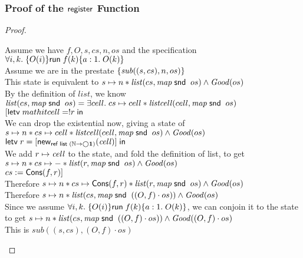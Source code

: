 \subsubsection{Proof of the $\mathsf{register}$ Function}
\begin{proof}
\begin{tabbedproof}
\oo Assume we have $f, O, s, cs, n, os$ and the specification $\forall i,k.\;\{{O(i)}\}{\mathsf{run}\;{f(k)}}\{{a:1}.\;{O(k)}\}$ \\
\ooo Assume we are in the prestate $\{{\mathit{sub}((s,cs), n, os)}\}$ \\
\ooo This state is equivalent to $s \mapsto n * \mathit{list}(cs, \mathit{map}\;\mathsf{snd}\;\;os) \land \mathit{Good}(os)$ \\
\ooo By the definition of $\mathit{list}$, we know \\
\ooox $\mathit{list}(cs, \mathit{map}\;\mathsf{snd}\;\;os) = \exists cell.\;cs \mapsto cell * \mathit{listcell}(cell, \mathit{map}\;\mathsf{snd}\;\;os)$ \\
\ooo $[\mathsf{letv}\;mathit{cell} = !r\;\mathsf{in}\;$ \\
\ooo We can drop the existential now, giving a state of \\
\ooox $s \mapsto n * cs \mapsto cell * \mathit{listcell}(cell, \mathit{map}\;\mathsf{snd}\;\;os) \land \mathit{Good}(os)$ \\
\ooo $\mathsf{letv}\;r = [\mathsf{new}_{\mathsf{ref}\;\mathsf{list}\;{(\mathbb{N} \to \bigcirc{\mathbf{1}})}}(\mathit{cell})]\;\mathsf{in}\;$ \\
\ooo We add $r \mapsto \mathit{cell}$ to the state, and fold the definition of list, to get \\
\ooox $s \mapsto n * cs \mapsto - * \mathit{list}(r, \mathit{map}\;\mathsf{snd}\;\;os) \land \mathit{Good}(os)$ \\ 
\ooo $cs := \mathsf{Cons}(f, r)]$ \\
\ooo Therefore $s \mapsto n * cs \mapsto \mathsf{Cons}(f,r) * \mathit{list}(r, \mathit{map}\;\mathsf{snd}\;\;os) \land \mathit{Good}(os)$ \\ 
\ooo Therefore $s \mapsto n * \mathit{list}(cs, \mathit{map}\;\mathsf{snd}\;\;((O,f) \cdot os)) \land \mathit{Good}(os)$ \\ 
\ooo Since we assume $\forall i,k.\;\{{O(i)}\}{\mathsf{run}\;{f(k)}}\{{a:1}.\;{O(k)}\}$, we can conjoin it to the state \\
\ooox to get $s \mapsto n * \mathit{list}(cs, \mathit{map}\;\mathsf{snd}\;\;((O,f) \cdot os)) \land \mathit{Good}((O,f) \cdot os)$ \\ 
\ooo This is $\mathit{sub}((s,cs), (O,f)\cdot os)$
\end{tabbedproof}
\end{proof}

